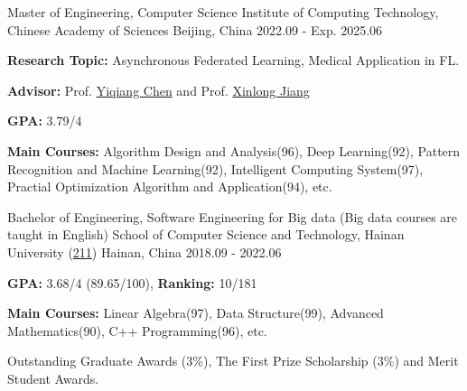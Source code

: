 
\begin{cventries}

\cventry
{Master of Engineering, Computer Science} %
{Institute of Computing Technology, Chinese Academy of Sciences} %
{Beijing, China} %
{2022.09 - Exp. 2025.06} %
{
  \begin{cvitems} %
    \item {\textbf{Research Topic:} Asynchronous Federated Learning, Medical Application in FL.}
    \item {\textbf{Advisor:} Prof. \href{https://www.ict.cas.cn/sourcedb_ict_cas/cn/jssrck/200909/t20090917_2496596.html}{Yiqiang Chen} and Prof. \href{http://english.ict.cas.cn/people/scien/bln/202303/t20230321_328588.html}{Xinlong Jiang}}
    \item {\textbf{GPA:} 3.79/4}
    \item {\textbf{Main Courses:} Algorithm Design and Analysis(96), Deep Learning(92), Pattern Recognition and Machine Learning(92), Intelligent Computing System(97), Practial Optimization Algorithm and Application(94), etc.}
  \end{cvitems}
}

\cventry
{Bachelor of Engineering, Software Engineering for Big data (Big data courses are taught in English)} %
{School of Computer Science and Technology, Hainan University (\href{https://en.wikipedia.org/wiki/Project_211}{211})} %
{Hainan, China} %
{2018.09 - 2022.06} %
{
  \begin{cvitems} %
    \item {\textbf{GPA:} 3.68/4 (89.65/100), \textbf{Ranking:} 10/181} %
    \item {\textbf{Main Courses:} Linear Algebra(97), Data Structure(99), Advanced Mathematics(90), C++ Programming(96), etc.}
    \item {Outstanding Graduate Awards (3\%), The First Prize Scholarship (3\%) and Merit Student Awards.}
  \end{cvitems}
}

\end{cventries}
